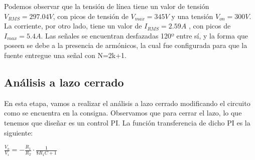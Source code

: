 \documentclass[e4_tp3_main.tex]{subfiles}
\begin{document}
Podemos observar que la tensión de línea tiene un valor de tensión $V_{RMS}=297.04V$, con picos de tensión de $V_{max}=345 V$ y una tensión $V_{on}=300V$. La corriente, por otro lado, tiene un valor de $I_{RMS}=2.59A$ , con picos de $I_{max}=5.4A$. 
Las señales se encuentran desfazadas 120º entre sí, y la forma que poseen se debe a la presencia de armónicos, la cual fue configurada para que la fuente entregue una señal con N=2k+1.

\subsection{Análisis a lazo cerrado}
En esta etapa, vamos a realizar el análisis a lazo cerrado modificando el circuito como se encuentra en la consigna.
Observamos que para cerrar el lazo, lo que tenemos que diseñar es un control PI. La función transferencia de dicho PI es la siguiente:

$\frac{V_o}{V_i}=-\frac{R_1}{R_2} \cdot \frac{1}{\$ R_1 C + 1} $
\end{document}
